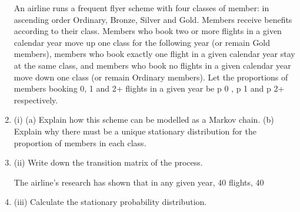 \documentclass[a4paper,12pt]{article}
\begin{document}
\begin{enumerate}

An airline runs a frequent flyer scheme with four classes of member: in ascending
order Ordinary, Bronze, Silver and Gold. Members receive benefits according to their
class. Members who book two or more flights in a given calendar year move up one
class for the following year (or remain Gold members), members who book exactly
one flight in a given calendar year stay at the same class, and members who book no
flights in a given calendar year move down one class (or remain Ordinary members).
Let the proportions of members booking 0, 1 and 2+ flights in a given year be p 0 , p 1
and p 2+ respectively.
\item (i)
(a) Explain how this scheme can be modelled as a Markov chain.
(b) Explain why there must be a unique stationary distribution for the
proportion of members in each class.
 
\item (ii)
Write down the transition matrix of the process.
 
The airline’s research has shown that in any given year, 40%
flights, 40%
\item (iii)
Calculate the stationary probability distribution.
 

\end{enumerate}
\end{document}
